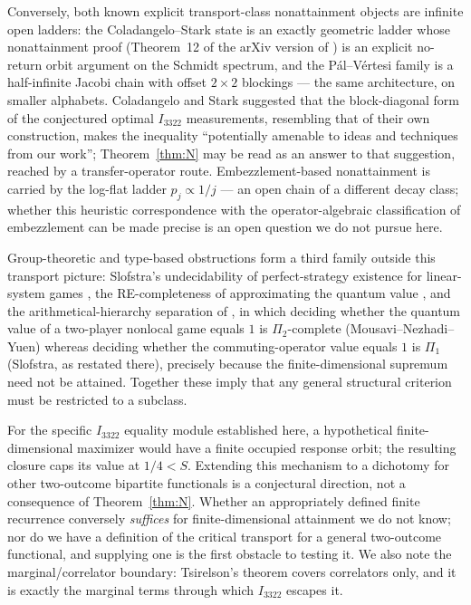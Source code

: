 \documentclass[11pt]{article}
\theoremstyle{remark}
\begin{document}
Conversely,
both known explicit transport-class nonattainment objects are infinite open
ladders: the Coladangelo--Stark state is an exactly geometric ladder whose
nonattainment proof (Theorem~12 of the arXiv version of
\cite{ColadangeloStark}) is an explicit
no-return orbit argument on the Schmidt spectrum,
and the P\'al--V\'ertesi family is a half-infinite Jacobi chain with offset
$2\times2$ blockings \cite{PalVertesi} --- the same architecture, on smaller
alphabets. Coladangelo and Stark suggested that the block-diagonal form of
the conjectured optimal $I_{3322}$ measurements, resembling that of their
own construction, makes the inequality ``potentially amenable to ideas and
techniques from our work''; Theorem~\ref{thm:N} may be read as an answer to
that suggestion, reached by a transfer-operator route. Embezzlement-based
nonattainment \cite{vanDamHayden,JLV,Coladangelo} is carried by the
log-flat ladder $p_j\propto1/j$ --- an open chain of a different decay
class; whether this heuristic correspondence with the operator-algebraic
classification of embezzlement \cite{vLSWW} can be made precise is an open
question we do
not pursue here.

Group-theoretic and type-based obstructions
\cite{Slofstra1,DPP,MusatRordam,MIPRE} form a third family outside this
transport picture: Slofstra's undecidability of perfect-strategy existence
for linear-system games \cite{Slofstra1}, the RE-completeness of
approximating the quantum value \cite{MIPRE}, and the arithmetical-hierarchy
separation of \cite{MNY}, in which deciding whether the quantum value of a
two-player nonlocal game equals $1$ is $\Pi_2$-complete
(Mousavi--Nezhadi--Yuen) whereas deciding whether the commuting-operator
value equals $1$ is $\Pi_1$ (Slofstra, as restated there), precisely
because the finite-dimensional supremum need not be attained. Together
these imply that any general
structural criterion must be restricted to a subclass.

For the specific $I_{3322}$ equality module established here, a hypothetical
finite-dimensional maximizer would have a finite occupied response orbit;
the resulting closure caps its value at $1/4<S$. Extending this mechanism
to a dichotomy for other two-outcome bipartite functionals is a conjectural
direction, not a consequence of Theorem~\ref{thm:N}. Whether an appropriately
defined finite recurrence conversely
\emph{suffices} for finite-dimensional attainment we do not know; nor do we
have a definition of the critical transport for a general two-outcome
functional, and supplying one is the
first obstacle to testing it. We also
note the marginal/correlator boundary: Tsirelson's theorem covers
correlators only, and it is exactly the marginal terms through which
$I_{3322}$ escapes it.
\end{document}
